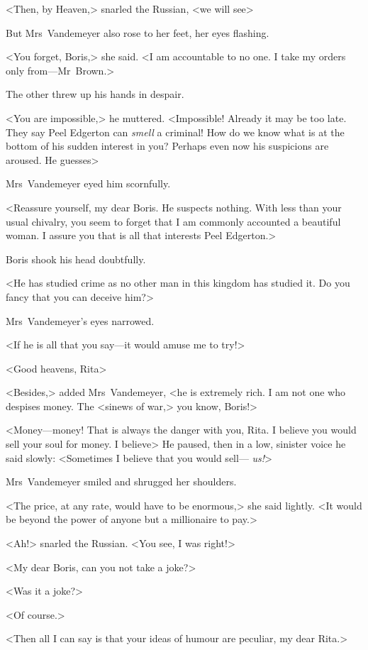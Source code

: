 <Then, by Heaven,> snarled the Russian, <we will see\longdash>

But Mrs~Vandemeyer also rose to her feet, her eyes flashing.

<You forget, Boris,> she said. <I am accountable to no one. I take my orders only from—Mr~Brown.>

The other threw up his hands in despair.

<You are impossible,> he muttered. <Impossible! Already it may be too late. They say Peel Edgerton can \emph{smell} a criminal! How do we know what is at the bottom of his sudden interest in you? Perhaps even now his suspicions are aroused. He guesses\longdash>

Mrs~Vandemeyer eyed him scornfully.

<Reassure yourself, my dear Boris. He suspects nothing. With less than your usual chivalry, you seem to forget that I am commonly accounted a beautiful woman. I assure you that is all that interests Peel Edgerton.>

Boris shook his head doubtfully.

<He has studied crime as no other man in this kingdom has studied it. Do you fancy that you can deceive him?>

Mrs~Vandemeyer's eyes narrowed.

<If he is all that you say—it would amuse me to try!>

<Good heavens, Rita\longdash>

<Besides,> added Mrs~Vandemeyer, <he is extremely rich. I am not one who despises money. The <sinews of war,> you know, Boris!>

<Money—money! That is always the danger with you, Rita. I believe you would sell your soul for money. I believe\longdash> He paused, then in a low, sinister voice he said slowly: <Sometimes I believe that you would sell— \emph{us!}>

Mrs~Vandemeyer smiled and shrugged her shoulders.

<The price, at any rate, would have to be enormous,> she said lightly. <It would be beyond the power of anyone but a millionaire to pay.>

<Ah!> snarled the Russian. <You see, I was right!>

<My dear Boris, can you not take a joke?>

<Was it a joke?>

<Of course.>

<Then all I can say is that your ideas of humour are peculiar, my dear Rita.>

